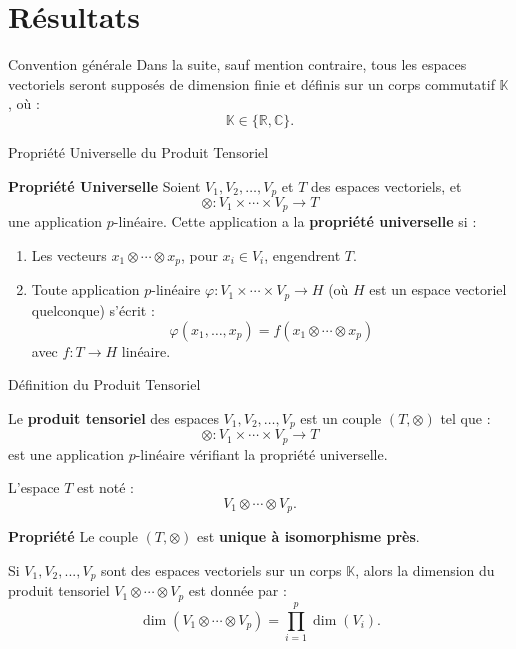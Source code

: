 \documentclass[9pt]{beamer}
\begin{document}
	\section{Résultats}
\begin{frame}{Convention générale}
Dans la suite, sauf mention contraire, tous les espaces vectoriels seront supposés de dimension finie et définis sur un corps commutatif \( \mathbb{K} \), où :
	\[
	\mathbb{K} \in \{ \mathbb{R}, \mathbb{C} \}.
	\]
\end{frame}

\begin{frame}{Propriété Universelle du Produit Tensoriel}
	\begin{block}{\textbf{Propriété Universelle}}
		Soient \( V_1, V_2, \ldots, V_p \) et \( T \) des espaces vectoriels, et
		\[
		\otimes : V_1 \times \cdots \times V_p \to T
		\]
		une application \( p \)-linéaire. Cette application a la \textbf{propriété universelle} si :
		\begin{enumerate}[label=\roman*)]
			\item Les vecteurs \( x_1 \otimes \cdots \otimes x_p \), pour \( x_i \in V_i \), engendrent \( T \).
			\item Toute application \( p \)-linéaire \( \varphi : V_1 \times \cdots \times V_p \to H \) (où \( H \) est un espace vectoriel quelconque) s’écrit :
			\[
			\varphi(x_1, \ldots, x_p) = f(x_1 \otimes \cdots \otimes x_p)
			\]
			avec \( f : T \to H \) linéaire.
		\end{enumerate}
	\end{block}
	
\end{frame}

\begin{frame}{Définition du Produit Tensoriel}
	\begin{definition}
		Le \textbf{produit tensoriel} des espaces \( V_1, V_2, \ldots, V_p \) est un couple \( (T, \otimes) \) tel que :
		\[
		\otimes : V_1 \times \cdots \times V_p \to T
		\]
		est une application \( p \)-linéaire vérifiant la propriété universelle.
		
		L’espace \( T \) est noté :
		\[
		V_1 \otimes \cdots \otimes V_p.
		\]
	\end{definition}
\begin{block}{\textbf{Propriété}}
	Le couple \( (T, \otimes) \) est \textbf{unique à isomorphisme près}.
\end{block}

	\begin{definition}
Si \( V_1, V_2, ... ,V_p \) sont des espaces vectoriels sur un corps \( \mathbb{K} \), alors la dimension du produit tensoriel \( V_1 \otimes \cdots \otimes V_p \) est donnée par :
	\[
	\dim(V_1 \otimes \cdots \otimes V_p) = \prod_{i=1}^p \dim(V_i).
	\]
\end{definition}

\end{frame}
\end{document}
